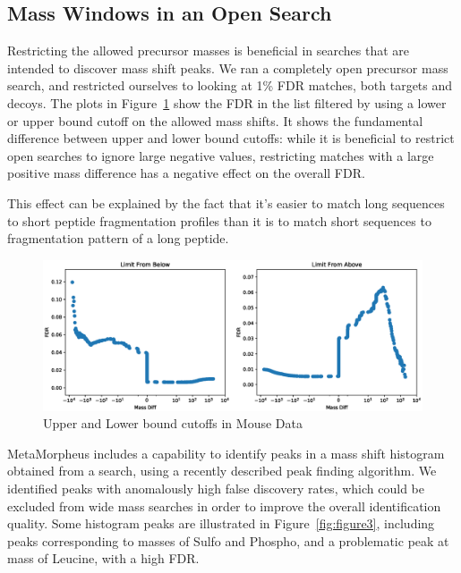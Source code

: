\documentclass[journal=jprobs,manuscript=article]{achemso}
\begin{document}
\subsection{Mass Windows in an Open Search}

Restricting the allowed precursor masses is beneficial in searches that are intended to discover mass shift peaks.
We ran a completely open precursor mass search, and restricted ourselves to looking at 1\% FDR matches, both targets and decoys.
The plots in Figure~\ref{fig:figure2-upperlowerbounds} show the FDR in the list filtered by using a lower or upper bound cutoff on the allowed mass shifts.
It shows the fundamental difference between upper and lower bound cutoffs: while it is beneficial to restrict open searches to ignore large negative values, restricting matches with a large positive mass difference has a negative effect on the overall FDR.

This effect can be explained by the fact that it's easier to match long sequences to short peptide fragmentation profiles than it is to match short sequences to fragmentation pattern of a long peptide.

\begin{figure}
\caption{Upper and Lower bound cutoffs in Mouse Data}
\label{fig:figure2-upperlowerbounds}
\includegraphics[scale=0.5]{figure_2-upperlowerbounds}
\end{figure}

MetaMorpheus includes a capability to identify peaks in a mass shift histogram obtained from a search, using a recently described peak finding algorithm\cite{Rodriguez_2014}.
We identified peaks with anomalously high false discovery rates, which could be excluded from wide mass searches in order to improve the overall identification quality.
Some histogram peaks are illustrated in Figure~\ref{fig:figure3}, including peaks corresponding to masses of Sulfo and Phospho, and a problematic peak at mass of Leucine, with a high FDR.
\end{document}

